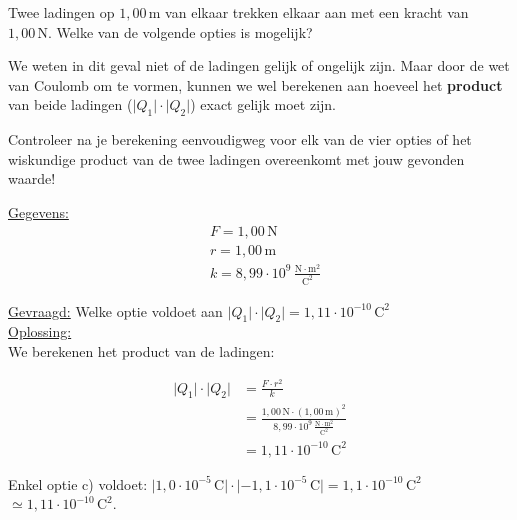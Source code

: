 \documentclass{ximera}
\begin{document}
\begin{exercise}
    Twee ladingen op \( 1{,}00 \, \mathrm{m} \) van elkaar trekken elkaar aan met een kracht van \( 1{,}00 \, \mathrm{N} \). Welke van de volgende opties is mogelijk?
    
    \begin{multipleChoice}
    \end{multipleChoice}

    \begin{hint}
        We weten in dit geval niet of de ladingen gelijk of ongelijk zijn. Maar door de wet van Coulomb om te vormen, kunnen we wel berekenen aan hoeveel het \textbf{product} van beide ladingen ($\lvert Q_1 \rvert \cdot \lvert Q_2 \rvert$) exact gelijk moet zijn.
    \end{hint}
    \begin{hint}
        Controleer na je berekening eenvoudigweg voor elk van de vier opties of het wiskundige product van de twee ladingen overeenkomt met jouw gevonden waarde!
    \end{hint}

    \begin{solution}\nl
        \underline{Gegevens:}
        \begin{align*}
            & F = 1{,}00 \, \mathrm{N} \\
            & r = 1{,}00 \, \mathrm{m} \\
            & k = 8{,}99 \cdot 10^9 \, \mathrm{\frac{N \cdot m^2}{C^2}}
        \end{align*}

        \underline{Gevraagd:} Welke optie voldoet aan \( \lvert Q_1 \rvert \cdot \lvert Q_2 \rvert = 1{,}11 \cdot 10^{-10} \, \mathrm{C^2} \) \\

        \underline{Oplossing:}\\
        We berekenen het product van de ladingen:

        \begin{align*}
            \lvert Q_1 \rvert \cdot \lvert Q_2 \rvert &= \frac{F \cdot r^2}{k} \\
            &= \frac{1{,}00 \, \mathrm{N} \cdot (1{,}00 \, \mathrm{m})^2}{8{,}99 \cdot 10^9 \, \mathrm{\frac{N \cdot m^2}{C^2}}} \\
            &= \boxed{1{,}11 \cdot 10^{-10} \, \mathrm{C^2}}
        \end{align*}

        Enkel optie c) voldoet: \( \lvert 1{,}0 \cdot 10^{-5} \, \mathrm{C} \rvert \cdot \lvert -1{,}1 \cdot 10^{-5} \, \mathrm{C} \rvert = 1{,}1 \cdot 10^{-10} \, \mathrm{C^2} \) $\simeq 1{,}11 \cdot 10^{-10} \, \mathrm{C^2}$.
    \end{solution}
\end{exercise}
\end{document}
